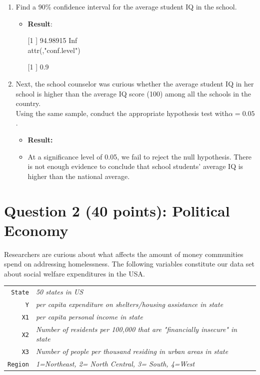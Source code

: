 \documentclass[12pt,letterpaper]{article}
\begin{document}
\begin{enumerate}
	\item Find a 90\% confidence interval for the average student IQ in the school.\\
	  
	  \begin{itemize}
		\item \textbf{Result}:
		\item  [[1]] 94.98915      Inf\\
		attr(,"conf.level")
		\item [[1]] 0.9
       \end{itemize}
	\item Next, the school counselor was curious  whether  the average student IQ in her school is higher than the average IQ score (100) among all the schools in the country.\\ 
	\noindent Using the same sample, conduct the appropriate hypothesis test with$\alpha=0.05$.
		 
		\begin{itemize}
	      \item \textbf{Result:}
		  \item  At a significance level of 0.05, we fail to reject the null hypothesis. There is not enough evidence to conclude that school students' average IQ is higher than the national average.
	\end{itemize}
\end{enumerate}

\newpage

	\section*{Question 2 (40 points): Political Economy}

\noindent Researchers are curious about what affects the amount of money communities spend on addressing homelessness. The following variables constitute our data set about social welfare expenditures in the USA. \\
\vspace{.5cm}


\begin{tabular}{r|l}
	\texttt{State} &\emph{50 states in US} \\
	\texttt{Y} & \emph{per capita expenditure on shelters/housing assistance in state}\\
	\texttt{X1} &\emph{per capita personal income in state} \\
	\texttt{X2} &  \emph{Number of residents per 100,000 that are "financially insecure" in state}\\
	\texttt{X3} &  \emph{Number of people per thousand residing in urban areas in state} \\
	\texttt{Region} &  \emph{1=Northeast, 2= North Central, 3= South, 4=West} \\
\end{tabular}
\end{document}
